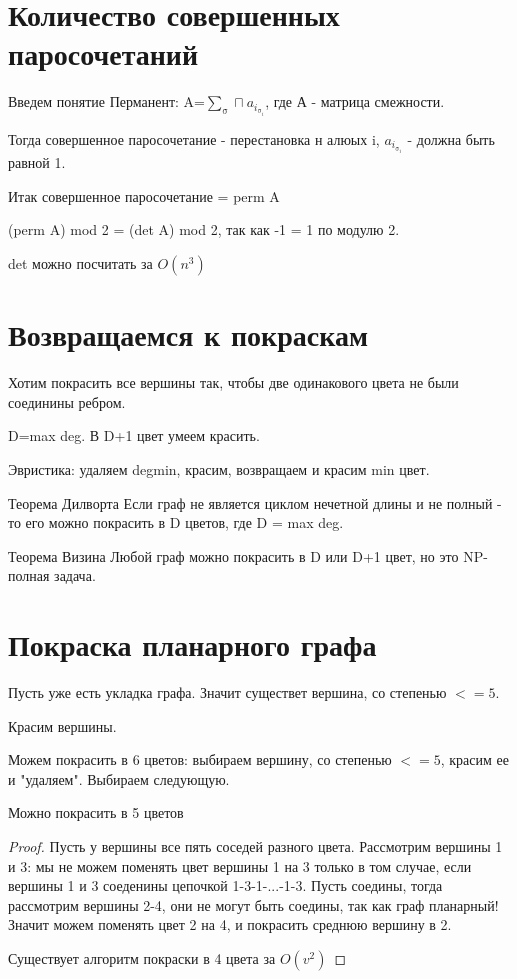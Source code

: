\section{Количество совершенных паросочетаний}

Введем понятие Перманент: A=$\sum_{\upsigma}\sqcap a_{i_{\upsigma_{i}}}$, где А - матрица  смежности.

Тогда совершенное паросочетание - перестановка н алюых i, $a_{i_{\upsigma_{i}}}$ - должна быть равной 1.

Итак совершенное паросочетание = perm A

(perm A) mod 2 = (det A) mod 2, так как -1 = 1 по модулю 2.
\begin{Rem}
det можно посчитать за $O(n^3)$
\end{Rem}

\section{Возвращаемся к покраскам}
Хотим покрасить все вершины так, чтобы две одинакового цвета не были соединины ребром.

D=max deg. В D+1 цвет умеем красить.

Эвристика: удаляем degmin, красим, возвращаем и красим min цвет.

\begin{theorem}{Теорема Дилворта}
Если граф не является циклом нечетной длины  и не полный - то его можно покрасить в D цветов, где D = max deg.
\end{theorem}

\begin{theorem}{Теорема Визина}
Любой граф можно покрасить в D или D+1 цвет, но это NP-полная задача.
\end{theorem}

\section{Покраска планарного графа}

Пусть уже есть укладка графа. Значит существет вершина, со степенью $<=5$.

Красим вершины.

Можем покрасить в 6 цветов: выбираем вершину, со степенью $<=5$, красим ее и "удаляем". Выбираем следующую.

\begin{theorem}{Можно покрасить в 5 цветов}
\end{theorem}
\begin{proof}
Пусть у вершины все пять соседей разного цвета. Рассмотрим вершины 1 и 3: мы не можем поменять цвет вершины 1 на 3 только в том случае, если вершины 1 и 3 соеденины цепочкой 1-3-1-...-1-3. Пусть соедины, тогда рассмотрим вершины 2-4, они не могут быть соедины, так как граф планарный! Значит можем поменять цвет 2 на 4, и покрасить среднюю вершину в 2.

Существует алгоритм покраски в 4 цвета за $O(v^2)$
\end{proof}
